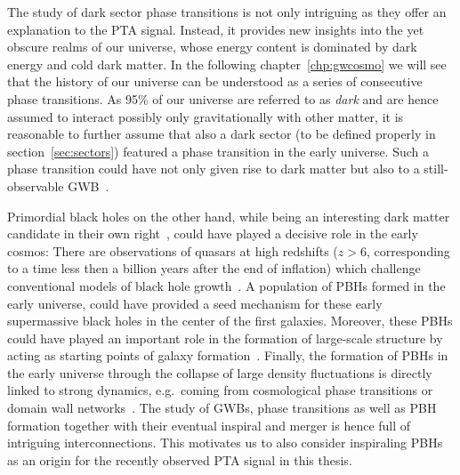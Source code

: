 The study of dark sector phase transitions is not only intriguing as they offer an explanation to the \ac{PTA} signal. Instead, it provides new insights into the yet obscure realms of our universe, whose energy content is dominated by dark energy and cold dark matter. In  the following chapter~\ref{chp:gwcosmo} we will see that the history of our  universe can be understood as a series of consecutive phase transitions. As 95\% of our universe are referred to as \textit{dark} and are hence assumed to interact possibly only gravitationally with other matter, it is reasonable to further assume that also a dark sector (to be defined properly in section~\ref{sec:sectors}) featured a phase transition in the early universe. Such a phase transition could have not only given rise to dark matter but also to a still-observable \ac{GWB}~\cite{Breitbach:2018ddu, Schwaller:2015tja, Caprini:2015zlo}.

Primordial black holes on the other hand, while being an interesting dark matter candidate in their own right~\cite{Carr:2020gox}, could have played a decisive role in the early cosmos: There are observations of quasars at high redshifts ($z > 6$, corresponding to a time less then a billion years after the end of inflation) which challenge conventional models of black hole growth~\cite{Volonteri:2010wz, Volonteri:2021sfo, Shapiro:2004ud, Volonteri:2006ma, Tanaka:2008bv}. A population of \acp{PBH} formed in the early universe, could have provided a seed mechanism for these early supermassive black holes in the  center of the first galaxies. Moreover, these \acp{PBH} could have played an important role in the formation of large-scale structure by acting as starting points of galaxy formation~\cite{Carr:2018rid}. Finally, the formation of \acp{PBH} in the early universe through the collapse of large density fluctuations is directly linked to strong dynamics, e.g.~coming from cosmological phase transitions or domain wall networks~\cite{Gouttenoire:2023naa, Gouttenoire:2023gbn}. The study of \acp{GWB}, phase transitions as well as \ac{PBH} formation together with their eventual inspiral and merger is hence full of intriguing interconnections. This motivates us to also consider inspiraling \acp{PBH} as an origin for the recently observed \ac{PTA} signal in this thesis.

